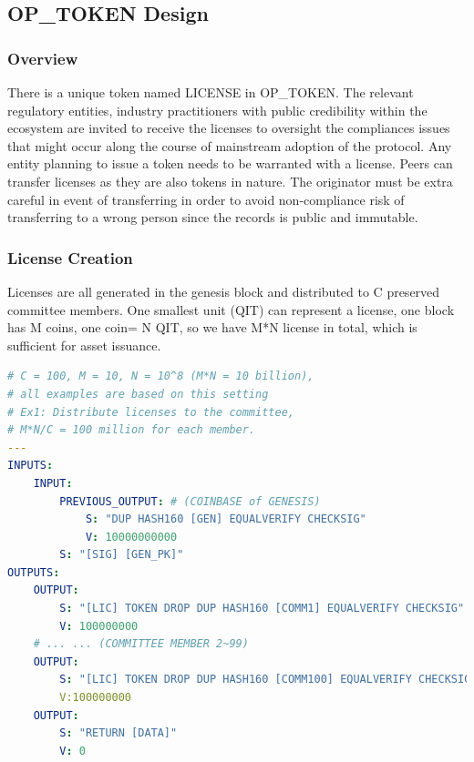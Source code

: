 \documentclass[a4paper,11pt]{article}
\begin{document}

\subsection{OP\_TOKEN Design}

\subsubsection{Overview}

There is a unique token named LICENSE in OP\_TOKEN. The relevant regulatory entities, industry practitioners with public credibility within the ecosystem are invited to receive the licenses to oversight the compliances issues that might occur along the course of mainstream adoption of the protocol. Any entity planning to issue a token needs to be warranted with a license. Peers can transfer licenses as they are also tokens in nature. The originator must be extra careful in event of transferring in order to avoid non-compliance risk of transferring to a wrong person since the records is public and immutable.  
 

\subsubsection{License Creation}

Licenses are all generated in the genesis block and distributed to C preserved committee members. One smallest unit (QIT) can represent a license, one block has M coins, one coin= N QIT, so we have M*N license in total, which is sufficient for asset issuance.


\begin{lstlisting}[language=yaml, numbers=none,basicstyle=\footnotesize]
# C = 100, M = 10, N = 10^8 (M*N = 10 billion),
# all examples are based on this setting
# Ex1: Distribute licenses to the committee,
# M*N/C = 100 million for each member.
---
INPUTS:
	INPUT:
		PREVIOUS_OUTPUT: # (COINBASE of GENESIS)
			S: "DUP HASH160 [GEN] EQUALVERIFY CHECKSIG"
			V: 10000000000
		S: "[SIG] [GEN_PK]"
OUTPUTS:
	OUTPUT:
		S: "[LIC] TOKEN DROP DUP HASH160 [COMM1] EQUALVERIFY CHECKSIG"
		V: 100000000
	# ... ... (COMMITTEE MEMBER 2~99)
	OUTPUT:
		S: "[LIC] TOKEN DROP DUP HASH160 [COMM100] EQUALVERIFY CHECKSIG"
		V:100000000
	OUTPUT:
		S: "RETURN [DATA]"
		V: 0
\end{lstlisting}
\end{document}
